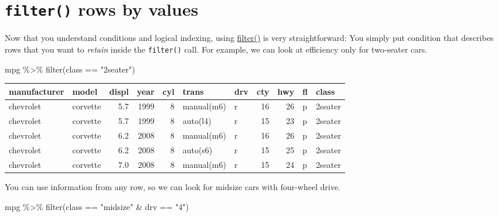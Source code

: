 \documentclass[
]{book}
\newenvironment{Shaded}{\begin{snugshade}}{\end{snugshade}}
\newcommand{\FunctionTok}[1]{\textcolor[rgb]{0.00,0.00,0.00}{#1}}
\newcommand{\NormalTok}[1]{#1}
\newcommand{\SpecialCharTok}[1]{\textcolor[rgb]{0.00,0.00,0.00}{#1}}
\newcommand{\StringTok}[1]{\textcolor[rgb]{0.31,0.60,0.02}{#1}}
\begin{document}
\hypertarget{filter-rows-by-values}{%
\section{\texorpdfstring{\texttt{filter()} rows by values}{filter() rows by values}}\label{filter-rows-by-values}}

Now that you understand conditions and logical indexing, using \href{https://dplyr.tidyverse.org/reference/filter.html}{filter()} is very straightforward: You simply put condition that describes rows that you want to \emph{retain} inside the \texttt{filter()} call. For example, we can look at efficiency only for two-seater cars.

\begin{Shaded}
\begin{Highlighting}[]
\NormalTok{mpg }\SpecialCharTok{\%\textgreater{}\%}
  \FunctionTok{filter}\NormalTok{(class }\SpecialCharTok{==} \StringTok{"2seater"}\NormalTok{)}
\end{Highlighting}
\end{Shaded}

\begin{tabular}{l|l|r|r|r|l|l|r|r|l|l}
\hline
manufacturer & model & displ & year & cyl & trans & drv & cty & hwy & fl & class\\
\hline
chevrolet & corvette & 5.7 & 1999 & 8 & manual(m6) & r & 16 & 26 & p & 2seater\\
\hline
chevrolet & corvette & 5.7 & 1999 & 8 & auto(l4) & r & 15 & 23 & p & 2seater\\
\hline
chevrolet & corvette & 6.2 & 2008 & 8 & manual(m6) & r & 16 & 26 & p & 2seater\\
\hline
chevrolet & corvette & 6.2 & 2008 & 8 & auto(s6) & r & 15 & 25 & p & 2seater\\
\hline
chevrolet & corvette & 7.0 & 2008 & 8 & manual(m6) & r & 15 & 24 & p & 2seater\\
\hline
\end{tabular}

You can use information from any row, so we can look for midsize cars with four-wheel drive.

\begin{Shaded}
\begin{Highlighting}[]
\NormalTok{mpg }\SpecialCharTok{\%\textgreater{}\%}
  \FunctionTok{filter}\NormalTok{(class }\SpecialCharTok{==} \StringTok{"midsize"} \SpecialCharTok{\&}\NormalTok{ drv }\SpecialCharTok{==} \StringTok{"4"}\NormalTok{)}
\end{Highlighting}
\end{Shaded}
\end{document}
